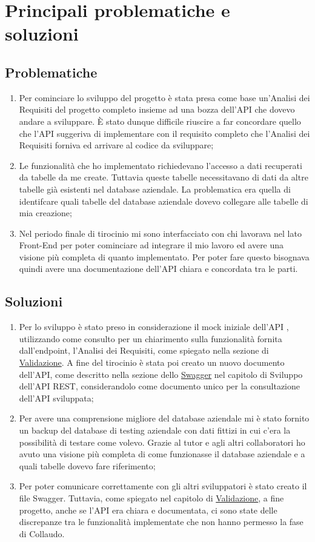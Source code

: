 \section{Principali problematiche e soluzioni}
\subsection*{Problematiche}
\begin{enumerate}
\item Per cominciare lo sviluppo del progetto è stata presa come base un’Analisi dei Requisiti del progetto completo insieme ad una bozza dell'API che dovevo andare a sviluppare. È stato dunque difficile riuscire a far concordare quello che l’API suggeriva di implementare con il requisito completo che l’Analisi dei Requisiti forniva ed arrivare al codice da sviluppare;
\item Le funzionalità che ho implementato richiedevano l'accesso a dati recuperati da tabelle da me create. Tuttavia queste tabelle necessitavano di dati da altre tabelle già esistenti nel database aziendale. La problematica era quella di identifcare quali tabelle del database aziendale dovevo collegare alle tabelle di mia creazione; 
\item Nel periodo finale di tirocinio mi sono interfacciato con chi lavorava nel lato Front-End per poter cominciare ad integrare il mio lavoro ed avere una visione più completa di quanto implementato. Per poter fare questo bisognava quindi avere una documentazione dell’API chiara e concordata tra le parti.
\end{enumerate}

\subsection*{Soluzioni}
\begin{enumerate}
\item Per lo sviluppo è stato preso in considerazione il mock iniziale dell’API , utilizzando come consulto per un chiarimento sulla funzionalità fornita dall’endpoint, l’Analisi dei Requisiti, come spiegato nella sezione di \hyperlink{validation}{Validazione}. A fine del tirocinio è stata poi creato un nuovo documento dell'API, come descritto nella sezione dello \hyperlink{swagger}{Swagger} nel capitolo di Sviluppo dell’API REST, considerandolo come documento unico per la consultazione dell’API sviluppata;
\item Per avere una comprensione migliore del database aziendale mi è stato fornito un backup del database di testing aziendale con dati fittizi in cui c’era la possibilità di testare come volevo. Grazie al tutor e agli altri collaboratori ho avuto una visione più completa di come funzionasse il database aziendale e a quali tabelle dovevo fare riferimento;
\item Per poter comunicare correttamente con gli altri sviluppatori è stato creato il file Swagger. Tuttavia, come spiegato nel capitolo di \hyperlink{validation}{Validazione}, a fine progetto, anche se l’API era chiara e documentata, ci sono state delle discrepanze tra le funzionalità implementate che non hanno permesso la fase di Collaudo.
\end{enumerate}

